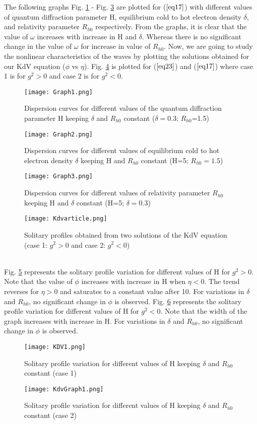 \documentclass[journal]{IEEEtran}
\begin{document}
The following graphs Fig. \ref{fig1} - Fig. \ref{fig3} are plotted for ($\ref{eq17}$) with different values of quantum diffraction parameter H,  equilibrium cold to hot electron density $\delta$, and relativity parameter $R_{h0}$ respectively. From the graphs, it is clear that the value of $\omega$ increases with increase in H and $\delta$. Whereas there is no significant change in the value of $\omega$ for increase in value of $R_{h0}$. 
Now, we are going to study the nonlinear characteristics of the waves by plotting the solutions obtained for our KdV equation ($\phi$ vs $\eta$). Fig. \ref{fig4} is plotted for ($\ref{eq23}$) and ($\ref{eq17}$) where case 1 is for $g^2>0$ and case 2 is for $g^2<0$. 
\begin{figure}[!t]
{	\centering
	\texttt{[image: Graph1.png]}
	\caption{Dispersion curves for different values of the quantum diffraction parameter H keeping $\delta$ and $R_{h0}$ constant ($\delta=0.3$; $R_{h0}$=1.5)}
	\label{fig1}
}
\end{figure}
\begin{figure}[!t]
{	\centering
	\texttt{[image: Graph2.png]}
	\caption{Dispersion curves for different values of equilibrium cold to hot electron density $\delta$ keeping H and $R_{h0}$ constant (H=5; $R_{h0}=1.5$)}
	\label{fig2}
}
\end{figure}
\begin{figure}[!t]
{	\centering
	\texttt{[image: Graph3.png]}
	\caption{Dispersion curves for different values of relativity parameter $R_{h0}$ keeping H and $\delta$ constant (H=5; $\delta=0.3$)}
	\label{fig3}
}
\end{figure}
\begin{figure}[!t]
{	\centering
	\texttt{[image: Kdvarticle.png]}
	\caption{Solitary profiles obtained from two solutions of the KdV equation (case 1: $g^2>0$ and case 2: $g^2<0$)}
	\label{fig4}
}
\end{figure}
\\
Fig. \ref{fig5} represents the solitary profile variation for different values of H for $g^2>0$. Note that the value of $\phi$ increases with increase in H when $\eta<0$. The trend reverses for $\eta>0$ and saturates to a constant value after 10. For variations in $\delta$ and $R_{h0}$, no significant change in $\phi$ is observed.
Fig. \ref{fig6} represents the solitary profile variation for different values of H for $g^2<0$. Note that the width of the graph increases with increase in H. For variations in $\delta$ and $R_{h0}$, no significant change in $\phi$ is observed.
\begin{figure}[!t]
{	\centering
	\texttt{[image: KDV1.png]}
	\caption{Solitary profile variation for different values of H keeping $\delta$ and $R_{h0}$ constant (case 1)}
	\label{fig5}
}
\end{figure}
\begin{figure}[!t]
{	\centering
	\texttt{[image: KdvGraph1.png]}
	\caption{Solitary profile variation for different values of H keeping $\delta$ and $R_{h0}$ constant (case 2)}
	\label{fig6}
}
\end{figure}
\end{document}
